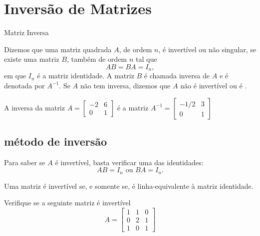 \section{Inversão de Matrizes}

\begin{frame}[label=inversao]{Matriz Inversa}

\begin{defin}
Dizemos que uma matriz quadrada $A$, de ordem $n$, é {\color{blue} invertível} ou {\color{blue} não singular}, se existe uma matriz $B$, também de ordem $n$ tal que
\[AB=BA=I_n,\]
em que $I_n$ é a matriz identidade. A matriz $B$ é chamada {\color{blue}inversa de $A$} e é denotada por $A^{-1}$. Se $A$ não tem inversa, dizemos que $A$ {\color{blue} não é invertível} ou é {\color{blue}{singular}}.
\end{defin}

\begin{exe}
A inversa da matriz 
$A=\begin{bmatrix}
-2 & 6\\ 0 & 1
\end{bmatrix}$ é a matriz $A^{-1}=\begin{bmatrix}
 -1/2 & 3\\ 0 & 1
\end{bmatrix}$
\end{exe}
\end{frame}

\subsection*{método de inversão}
\begin{frame}[label=inversao]

\begin{prop}
Para saber se $A$ é invertível, basta verificar uma das identidades:
\[AB=I_n \text{ ou } BA=I_n.\]
\end{prop}

\begin{teo}
Uma matriz é invertível se, e somente se, é linha-equivalente à matriz identidade.
\end{teo}

\begin{exe}
Verifique se a seguinte matriz é invertível
\[
A=\begin{bmatrix}
1 & 1 & 0\\ 0 & 2 & 1 \\ 1& 0 & 1
\end{bmatrix}
\] 
\end{exe}

\end{frame}


